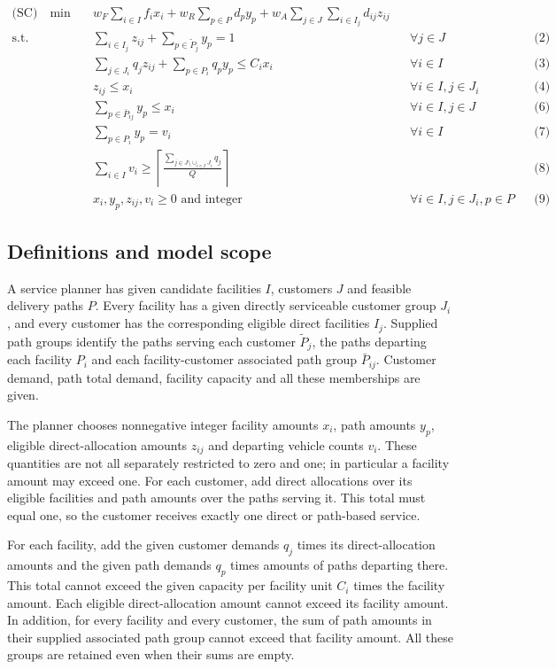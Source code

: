 \documentclass[10pt]{article}
\begin{document}
\[
\begin{aligned}
\text{(SC)} \quad \min \quad & w_F \sum_{i \in I} f_i x_i + w_R \sum_{p \in P} d_p y_p + w_A \sum_{j \in J} \sum_{i \in I_j} d_{ij} z_{ij} \\
\text{s.t.} \quad & \sum_{i \in I_j} z_{ij} + \sum_{p \in \tilde{P}_j} y_p = 1 && \forall j \in J && \text{(2)} \\
& \sum_{j \in J_i} q_j z_{ij} + \sum_{p \in P_i} q_p y_p \le C_i x_i && \forall i \in I && \text{(3)} \\
& z_{ij} \le x_i && \forall i \in I, j \in J_i && \text{(4)} \\
& \sum_{p \in \bar{P}_{ij}} y_p \le x_i && \forall i \in I, j \in J && \text{(6)} \\
& \sum_{p \in P_i} y_p = v_i && \forall i \in I && \text{(7)} \\
& \sum_{i \in I} v_i \ge \left\lceil \frac{\sum_{j \in J \setminus \cup_{i \in I} J_i} q_j}{Q} \right\rceil && && \text{(8)} \\
& x_i, y_p, z_{ij}, v_i \ge 0 \text{ and integer} && \forall i \in I, j \in J_i, p \in P && \text{(9)}
\end{aligned}
\]

\subsection*{Definitions and model scope}
A service planner has given candidate facilities $I$, customers $J$ and feasible delivery paths $P$. Every facility has a given directly serviceable customer group $J_i$, and every customer has the corresponding eligible direct facilities $I_j$. Supplied path groups identify the paths serving each customer $\tilde P_j$, the paths departing each facility $P_i$ and each facility-customer associated path group $\bar P_{ij}$. Customer demand, path total demand, facility capacity and all these memberships are given.

The planner chooses nonnegative integer facility amounts $x_i$, path amounts $y_p$, eligible direct-allocation amounts $z_{ij}$ and departing vehicle counts $v_i$. These quantities are not all separately restricted to zero and one; in particular a facility amount may exceed one. For each customer, add direct allocations over its eligible facilities and path amounts over the paths serving it. This total must equal one, so the customer receives exactly one direct or path-based service.

For each facility, add the given customer demands $q_j$ times its direct-allocation amounts and the given path demands $q_p$ times amounts of paths departing there. This total cannot exceed the given capacity per facility unit $C_i$ times the facility amount. Each eligible direct-allocation amount cannot exceed its facility amount. In addition, for every facility and every customer, the sum of path amounts in their supplied associated path group cannot exceed that facility amount. All these groups are retained even when their sums are empty.
\end{document}
